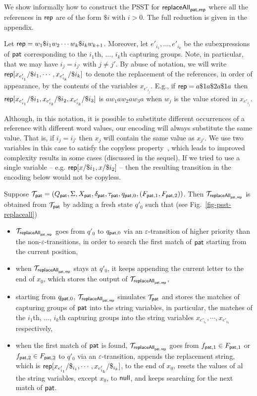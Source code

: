 We show informally how to construct the PSST for $\mathsf{replaceAll}_{\mathsf{pat}, \mathsf{rep}}$ where all the references in $\mathsf{rep}$ are of the form $\$i$ with $i > 0$.
The full reduction is given in the appendix.

Let $\mathsf{rep} = w_1 \$i_1 w_2 \cdots w_k \$i_k w_{k+1}$. Moreover, let $e'_{i_1},\ldots, e'_{i_k}$ be the subexpressions of $\mathsf{pat}$ corresponding to the $i_1$th, $\ldots$, $i_k$th capturing groups.
Note, in particular, that we may have $i_j = i_{j'}$ with $j \neq j'$.
By abuse of notation, we will write
$\mathsf{rep}[x_{e'_{i_1}}/\$i_1,\cdots,x_{e'_{i_k}}/\$i_k]$
to denote the replacement of the references, in order of appearance, by the contents of the variables $x_{e'_{i_j}}$.
E.g., if
$\mathsf{rep} = a \$1 a \$2 a \$1 a$
then
$\mathsf{rep}[x_{e'_{i_1}}/\$i_1, x_{e'_{i_2}}/\$i_2,x_{e'_{i_3}}/\$i_3]$
is $a w_1 a w_2 a w_3 a$ when $w_j$ is the value stored in $x_{e'_{i_j}}$.

Although, in this notation, it is possible to substitute different occurrences of a reference with different word values, our encoding will always substitute the same value.
That is, if $i_j = i_{j'}$ then $x_j$ will contain the same value as $x_{j'}$.
We use two variables in this case to satisfy the copyless property~\cite{AC10}, which leads to improved complexity results in some cases (discussed in the sequel).
If we tried to use a single variable – e.g. $\mathsf{rep}[x/\$i_1,x/\$i_2]$ – then the resulting transition in the encoding below would not be copyless.

 Suppose $\mathcal{T}_{\mathsf{pat}} = (Q_{\mathsf{pat}}, \Sigma, X_{\mathsf{pat}}, \delta_{\mathsf{pat}}, \tau_{\mathsf{pat}}, q_{\mathsf{pat},0}, (F_{\mathsf{pat},1}, F_{\mathsf{pat},2}))$.
Then $\mathcal{T}_{\mathsf{replaceAll}_{\mathsf{pat},\mathsf{rep}}}$ is obtained from $\mathcal{T}_{\mathsf{pat}}$ by adding a fresh state $q'_0$ such that (see Fig.~\ref{fig-psst-replaceall})
\begin{itemize}
    \item $\mathcal{T}_{\mathsf{replaceAll}_{\mathsf{pat},\mathsf{rep}}}$ goes from $q'_0$ to $q_{\mathsf{pat},0}$ via an $\varepsilon$-transition of higher priority than the non-$\varepsilon$-transitions, in order to search the first match of $\mathsf{pat}$ starting from the current position,
    \item when $\mathcal{T}_{\mathsf{replaceAll}_{\mathsf{pat},\mathsf{rep}}}$ stays at $q'_0$, it keeps appending the current letter to the end of $x_0$, which stores the output of $\mathcal{T}_{\mathsf{replaceAll}_{\mathsf{pat},\mathsf{rep}}}$,
    \item starting from $q_{\mathsf{pat}, 0}$, $\mathcal{T}_{\mathsf{replaceAll}_{\mathsf{pat},\mathsf{rep}}}$ simulates $\mathcal{T}_{\mathsf{pat}}$ and stores the matches of capturing groups of $\mathsf{pat}$ into the string variables, in particular,
    the matches of the $i_1$th, $\ldots$, $i_k$th capturing groups into the string variables $x_{e'_{i_1}}, \cdots, x_{e'_{i_k}}$ respectively,
    \item when the first match of $\mathsf{pat}$ is found, $\mathcal{T}_{\mathsf{replaceAll}_{\mathsf{pat},\mathsf{rep}}}$ goes from $f_{\mathsf{pat},1} \in F_{\mathsf{pat}, 1}$ or $f_{\mathsf{pat}, 2} \in F_{\mathsf{pat}, 2}$ to $q'_0$ via an $\varepsilon$-transition, appends the replacement string, which is $\mathsf{rep}[x_{e'_{i_1}}/\$_{i_1}, \cdots, x_{e'_{i_k}}/\$_{i_k}]$, to the end of $x_0$, resets the values of al the string variables, except $x_0$, to $\mathsf{null}$, and keeps searching for the next match of $\mathsf{pat}$.
\end{itemize}

